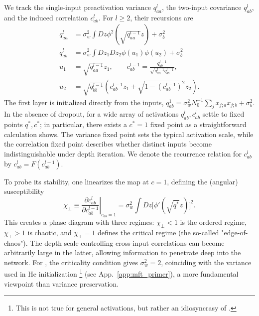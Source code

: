 We track the single-input preactivation variance $q^l_{aa}$, the two-input covariance $q^l_{ab}$, and the induced correlation $c^l_{ab}$. For $l\ge2$, their recursions are
\begin{align}
q^{l}_{aa}&= \sigma_{w}^{2}\int Dz \phi^{2}\left(\sqrt{q^{l-1}_{aa}} z\right)+\sigma_{b}^{2}\\
q^{l}_{ab}&=\sigma_{w}^{2}\int Dz_{1} Dz_{2} \phi(u_{1}) \phi(u_{2})+\sigma_{b}^{2}\\
u_{1}&=\sqrt{q^{l-1}_{aa}} z_{1},\qquad c^{l-1}_{ab}=\frac{q^{l-1}_{ab}}{\sqrt{q^{l-1}_{aa} q^{l-1}_{bb}}},\\
u_{2}&=\sqrt{q^{l-1}_{bb}}\left(c^{l-1}_{ab} z_{1}+\sqrt{1-\left(c^{l-1}_{ab}\right)^{2}} z_{2}\right).
\label{variancerecursion}
\end{align}
The first layer is initialized directly from the inputs, $q^1_{ab}=\sigma_w^2 N_0^{-1}\sum_j x_{j;a}x_{j;b}+\sigma_b^2$.
In the absence of dropout, for a wide array of activations $q^{l}_{ab},c^{l}_{ab}$ settle to fixed points $q^*,c^*$; in particular, there exists a $c^*=1$ fixed point as a straightforward calculation shows. The variance fixed point sets the typical activation scale, while the correlation fixed point describes whether distinct inputs become indistinguishable under depth iteration. We denote the recurrence relation for $c^{l}_{ab}$ by $c^{l}_{ab}=F(c^{l-1}_{ab})$.

To probe its stability, one linearizes the map at $c=1$, defining the (angular) susceptibility
\begin{equation}
\chi_{\perp} \equiv \left.\frac{\partial c^{l}_{ab}}{\partial c^{l-1}_{ab}}\right|_{c_{ab}=1} = \sigma_{w}^{2}\int Dz \big[\phi'(\sqrt{q^{*}} z)\big]^{2}.
\end{equation}
This creates a phase diagram with three regimes: $\chi_{\perp}<1$ is the ordered regime, $\chi_{\perp}>1$ is chaotic, and
 $\chi_{\perp}=1$ defines the critical regime (the so-called "edge-of-chaos"). The depth scale controlling cross-input correlations can become arbitrarily large in the latter, allowing information to penetrate deep into the network. For \relu{}, the criticality condition gives $\sigma_w^2=2$, coinciding with the variance used in He initialization \cite{he2015delvingdeeprectifierssurpassing}\footnote{This is not true for general activations, but rather an idiosyncrasy of \relu{}.} (see App.~\ref{app:mft_primer}), a more fundamental viewpoint than variance preservation.

